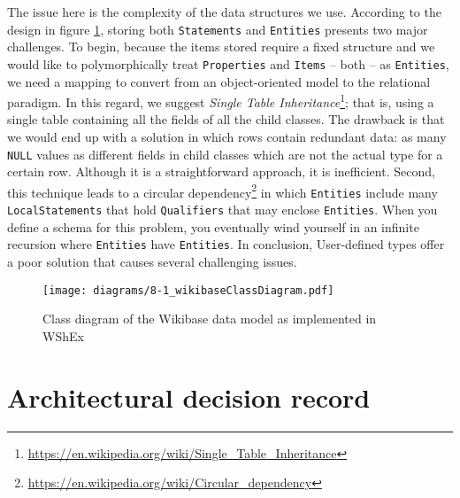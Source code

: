 \begin{code}
    \inputminted{scala}{code/listings/8-2_udtRegistration.scala}
\end{code}

The issue here is the complexity of the data structures we use. According to the design in figure \ref{fig:wikibaseClassDiagram}, storing both \texttt{Statements} and \texttt{Entities} presents two major challenges. To begin, because the items stored require a fixed structure and we would like to polymorphically treat \texttt{Properties} and \texttt{Items} -- both -- as \texttt{Entities}, we need a mapping to convert from an object-oriented model to the relational paradigm. In this regard, we suggest \textit{Single Table Inheritance}\footnote{\url{https://en.wikipedia.org/wiki/Single_Table_Inheritance}}; that is, using a single table containing all the fields of all the child classes. The drawback is that we would end up with a solution in which rows contain redundant data: as many \texttt{NULL} values as different fields in child classes which are not the actual type for a certain row. Although it is a straightforward approach, it is inefficient. Second, this technique leads to a circular dependency\footnote{\url{https://en.wikipedia.org/wiki/Circular_dependency}} in which \texttt{Entities} include many \texttt{LocalStatements} that hold \texttt{Qualifiers} that may enclose \texttt{Entities}. When you define a schema for this problem, you eventually wind yourself in an infinite recursion where \texttt{Entities} have \texttt{Entities}. In conclusion, User-defined types offer a poor solution that causes several challenging issues.

\begin{figure}[ht]
    \centering
    \texttt{[image: diagrams/8-1\_wikibaseClassDiagram.pdf]}
    \caption[Class diagram of the Wikibase data model as implemented in WShEx]{Class diagram of the Wikibase data model as implemented in WShEx\footnotemark}
    \label{fig:wikibaseClassDiagram}
\end{figure}

\section{Architectural decision record}
